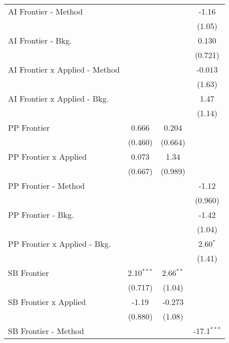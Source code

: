 \begin{tabular}{lccc}
   AI Frontier - Method           &              &             & -1.16\\   
                                  &              &             & (1.05)\\   
   AI Frontier - Bkg.             &              &             & 0.130\\   
                                  &              &             & (0.721)\\   
   AI Frontier x Applied - Method &              &             & -0.013\\   
                                  &              &             & (1.63)\\   
   AI Frontier x Applied - Bkg.   &              &             & 1.47\\   
                                  &              &             & (1.14)\\   
   PP Frontier                    & 0.666        & 0.204       &   \\   
                                  & (0.460)      & (0.664)     &   \\   
   PP Frontier x Applied          & 0.073        & 1.34        &   \\   
                                  & (0.667)      & (0.989)     &   \\   
   PP Frontier - Method           &              &             & -1.12\\   
                                  &              &             & (0.960)\\   
   PP Frontier - Bkg.             &              &             & -1.42\\   
                                  &              &             & (1.04)\\   
   PP Frontier x Applied - Bkg.   &              &             & 2.60$^{*}$\\   
                                  &              &             & (1.41)\\   
   SB Frontier                    & 2.10$^{***}$ & 2.66$^{**}$ &   \\   
                                  & (0.717)      & (1.04)      &   \\   
   SB Frontier x Applied          & -1.19        & -0.273      &   \\   
                                  & (0.880)      & (1.08)      &   \\   
   SB Frontier - Method           &              &             & -17.1$^{***}$\\   

\end{tabular}
